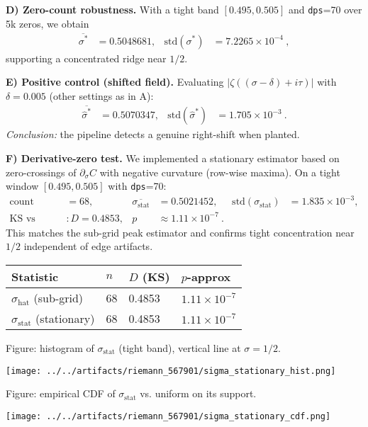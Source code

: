 \documentclass[10pt]{article}
\begin{document}
\textbf{D) Zero-count robustness.} With a tight band $[0.495,0.505]$ and \texttt{dps}=70 over 5k zeros, we obtain
\begin{align*}
  \overline{\sigma^*} &= 0.5048681, & \mathrm{std}(\sigma^*) &= 7.2265\times10^{-4}~,
\end{align*}
supporting a concentrated ridge near $1/2$.

\textbf{E) Positive control (shifted field).} Evaluating $|\zeta((\sigma-\delta)+i\tau)|$ with $\delta=0.005$ (other settings as in A):
\begin{align*}
  \overline{\hat\sigma^*} &= 0.5070347, & \mathrm{std}(\hat\sigma^*) &= 1.705\times10^{-3}~.
\end{align*}
\emph{Conclusion:} the pipeline detects a genuine right-shift when planted.

\textbf{F) Derivative-zero test.} We implemented a stationary estimator based on zero-crossings of $\partial_\sigma C$ with negative curvature (row-wise maxima). On a tight window $[0.495,0.505]$ with \texttt{dps}=70:
\begin{align*}
  \text{count} &= 68, & \overline{\sigma_{\mathrm{stat}}} &= 0.5021452, & \mathrm{std}(\sigma_{\mathrm{stat}}) &= 1.835\times10^{-3},\\
  \text{KS vs uniform} &: D=0.4853, & p &\approx 1.11\times10^{-7}~.
\end{align*}
This matches the sub-grid peak estimator and confirms tight concentration near $1/2$ independent of edge artifacts.

\begin{center}
\begin{tabular}{@{}llll@{}}
\textbf{Statistic} & $n$ & $D$ (KS) & $p$-approx \\
\hline
$\sigma_{\mathrm{hat}}$ (sub-grid) & 68 & 0.4853 & $1.11\times10^{-7}$ \\
$\sigma_{\mathrm{stat}}$ (stationary) & 68 & 0.4853 & $1.11\times10^{-7}$ \\
\end{tabular}
\end{center}

\noindent Figure: histogram of $\sigma_{\mathrm{stat}}$ (tight band), vertical line at $\sigma=1/2$.
\begin{center}
\texttt{[image: ../../artifacts/riemann\_567901/sigma\_stationary\_hist.png]}
\end{center}

\noindent Figure: empirical CDF of $\sigma_{\mathrm{stat}}$ vs. uniform on its support.
\begin{center}
\texttt{[image: ../../artifacts/riemann\_567901/sigma\_stationary\_cdf.png]}
\end{center}
\end{document}
